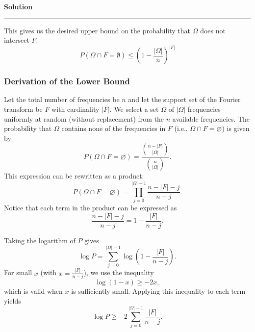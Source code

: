 \documentclass[a4paper,12pt]{article}
\newenvironment{solution}[2][]{%
    \begin{mdframed}[linecolor=blue!70!black, linewidth=2pt, roundcorner=10pt, backgroundcolor=yellow!10!white, skipabove=12pt, skipbelow=12pt]%
        \textbf{\large #2}
        \par\noindent\rule{\textwidth}{0.4pt}
}{
    \end{mdframed}
}
\begin{document}
\begin{solution}{Solution}
  This gives us the desired upper bound on the probability that $\Omega$ does not intersect $F$.
  \begin{equation}
    P(\Omega \cap F = \emptyset) \leq \left(1 - \frac{|\Omega|}{n}\right)^{|F|}
  \end{equation}

  \subsubsection*{Derivation of the Lower Bound}
 
Let the total number of frequencies be \( n \) and let the support set of the Fourier transform be \( F \) with cardinality \(|F|\). We select a set \( \Omega \) of \(|\Omega|\) frequencies uniformly at random (without replacement) from the \( n \) available frequencies. The probability that \(\Omega\) contains none of the frequencies in \( F \) (i.e., \( \Omega \cap F = \varnothing \)) is given by
\begin{equation}
P\left(\Omega\cap F=\varnothing\right)=\frac{\binom{n-|F|}{|\Omega|}}{\binom{n}{|\Omega|}}.
\end{equation}
This expression can be rewritten as a product:
\begin{equation}
P\left(\Omega\cap F=\varnothing\right) = \prod_{j=0}^{|\Omega|-1} \frac{n-|F|-j}{n-j}.
\end{equation}
Notice that each term in the product can be expressed as
\begin{equation}
\frac{n-|F|-j}{n-j} = 1 - \frac{|F|}{n-j}.
\end{equation}
 
Taking the logarithm of \( P \) gives
\begin{equation}
\log P = \sum_{j=0}^{|\Omega|-1} \log\left(1-\frac{|F|}{n-j}\right).
\end{equation}
For small \( x \) (with \( x = \displaystyle\frac{|F|}{n-j} \)), we use the inequality
\begin{equation}
\log(1-x) \ge -2x,
\end{equation}
which is valid when \( x \) is sufficiently small. Applying this inequality to each term yields
\begin{equation}
\log P \ge -2\sum_{j=0}^{|\Omega|-1} \frac{|F|}{n-j}.
\end{equation}
 

\end{solution}
\end{document}
